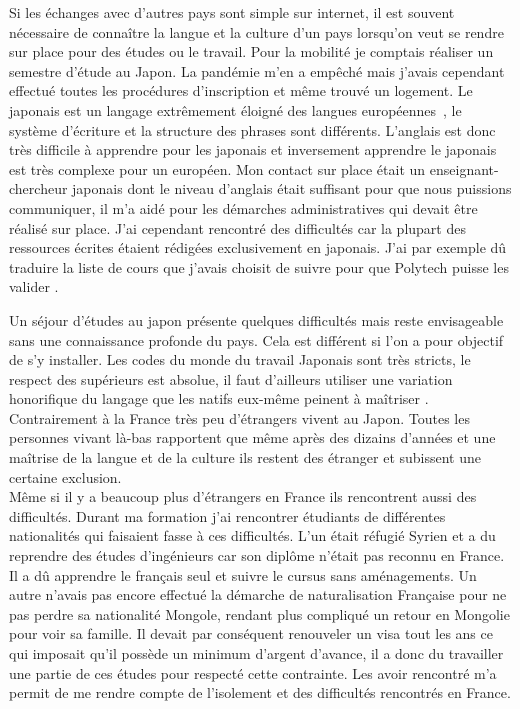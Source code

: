 \documentclass[french,a4paper,12pt]{report}
\begin{document}
Si les échanges avec d'autres pays sont simple sur internet, il est souvent nécessaire de connaître la langue et la culture d'un pays lorsqu'on veut se rendre sur place pour des études ou le travail. Pour la mobilité je comptais réaliser un semestre d'étude au Japon. La pandémie m’en a empêché mais j’avais cependant effectué toutes les procédures d’inscription et même trouvé un logement. Le japonais est un langage extrêmement éloigné des langues européennes , le système d’écriture et la structure des phrases sont différents. L’anglais est donc très difficile à apprendre pour les japonais et inversement apprendre le japonais est très complexe pour un européen. Mon contact sur place était un enseignant-chercheur japonais dont le niveau d’anglais était suffisant pour que nous puissions communiquer, il m’a aidé pour les démarches administratives qui devait être réalisé sur place. J’ai cependant rencontré des difficultés car la plupart des ressources écrites étaient rédigées exclusivement en japonais. J’ai par exemple dû traduire la liste de cours que j’avais choisit de suivre pour que Polytech puisse les valider .

Un séjour d'études au japon présente quelques difficultés mais reste envisageable sans une connaissance profonde du pays. Cela est différent si l'on a pour objectif de s'y installer.
Les codes du monde du travail Japonais sont très stricts, le respect des supérieurs est absolue, il faut d'ailleurs utiliser une variation honorifique du langage que les natifs eux-même peinent à maîtriser .
Contrairement à la France très peu d'étrangers vivent au Japon. Toutes les personnes vivant là-bas rapportent que même après des dizains d’années et une maîtrise de la langue et de la culture ils restent des étranger et subissent une certaine exclusion.\\

Même si il y a beaucoup plus d'étrangers en France ils rencontrent aussi des difficultés. Durant ma formation j'ai rencontrer étudiants de différentes nationalités qui faisaient fasse à ces difficultés. L'un était réfugié Syrien et a du reprendre des études d'ingénieurs car son diplôme n'était pas reconnu en France. Il a dû apprendre le français seul et suivre le cursus sans aménagements.
Un autre n'avais pas encore effectué la démarche de naturalisation Française pour ne pas perdre sa nationalité Mongole, rendant plus compliqué un retour en Mongolie pour voir sa famille. Il devait par conséquent renouveler un visa tout les ans ce qui imposait qu'il possède un minimum d'argent d'avance, il a donc du travailler une partie de ces études pour respecté cette contrainte.
Les avoir rencontré m'a permit de me rendre compte de l'isolement et des difficultés rencontrés en France.\\
\end{document}
